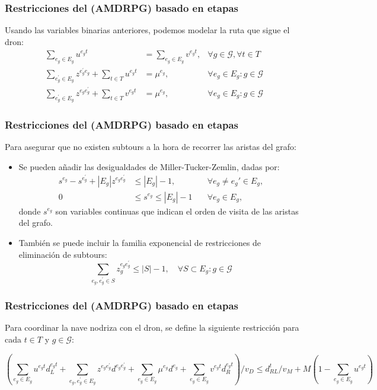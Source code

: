 \documentclass[slidestop,usepdftitle=false, xcolor=table]{beamer}
\begin{document}
	\begin{frame}
		\frametitle{Restricciones del (AMDRPG) basado en etapas}
		Usando las variables binarias anteriores, podemos modelar la ruta que sigue el dron:
		\begin{align}
    \sum_{e_g\in E_g} u^{e_gt} & = \sum_{e_g\in E_g} v^{e_gt}, &\forall g\in\mathcal G, \forall t\in T \label{st:Duv}\\%
    \sum_{e^\prime_g\in E_g} z^{e^\prime_ge_g} + \sum_{t\in T} u^{e_gt} & = \mu^{e_g}, &\forall e_g\in E_g:g\in\mathcal G \label{st:DInu}\\
    \sum_{e^\prime_g\in E_g} z^{e_ge^\prime_g} + \sum_{t\in T} v^{e_gt} & = \mu^{e_g}, &\forall e_g\in E_g:g\in\mathcal G \label{st:DInv}
\end{align}

	\end{frame}
	
	\begin{frame}
		\frametitle{Restricciones del (AMDRPG) basado en etapas}
		\begin{small}
		Para asegurar que no existen subtours a la hora de recorrer las aristas del grafo: 
		\begin{itemize}
		\item Se pueden añadir las desigualdades de Miller-Tucker-Zemlin, dadas por:
		\begin{align}
		    s^{e_g} - s^{e^\prime_g} + |E_g|z^{e_ge^\prime_g} & \leq |E_g| - 1  , &\quad\forall e_g \neq e_g'\in E_g \tag{MTZ$_1$}, \label{MTZ1}\\
    0 & \leq s^{e_g} \leq |E_g| - 1 &\quad\forall e_g\in E_g\tag{MTZ$_2$},\label{MTZ2}
    \end{align}
    donde $s^{e_g}$ son variables continuas que indican el orden de visita de las aristas del grafo.
    \pause
    \item También se puede incluir la familia exponencial de restricciones de eliminación de subtours:
    \begin{equation}\tag{SEC}\label{SEC}
    \sum_{e_g, e^\prime_g \in S} z_g^{e_ge^\prime_g} \leq |S| - 1, \quad \forall S\subset E_g:g\in \mathcal G
\end{equation}
\end{itemize}
\end{small}
\end{frame}


\begin{frame}
	\frametitle{Restricciones del (AMDRPG) basado en etapas}
	Para coordinar la nave nodriza con el dron, se define la siguiente restricción para cada $t\in T$ y $g\in\mathcal G$:
	\begin{tiny}
	\begin{equation}\tag{DCW-t}\label{DCW-t}
\left(\sum_{e_g\in E_g} u^{e_gt}d_L^{e_gt} + \sum_{e_g, e^\prime_g\in E_g}z^{e_ge^\prime_g}d^{e_ge^\prime_g} + \sum_{e_g\in E_g} \mu^{e_g}d^{e_g} + \sum_{e_g\in E_g} v^{e_gt}d_R^{e_gt}\right)/v_D \leq d_{RL}^t/v_M + M(1 - \sum_{e_g\in E_g} u^{e_gt})
\end{equation}	
	\end{tiny}

	
\end{frame}
\end{document}
